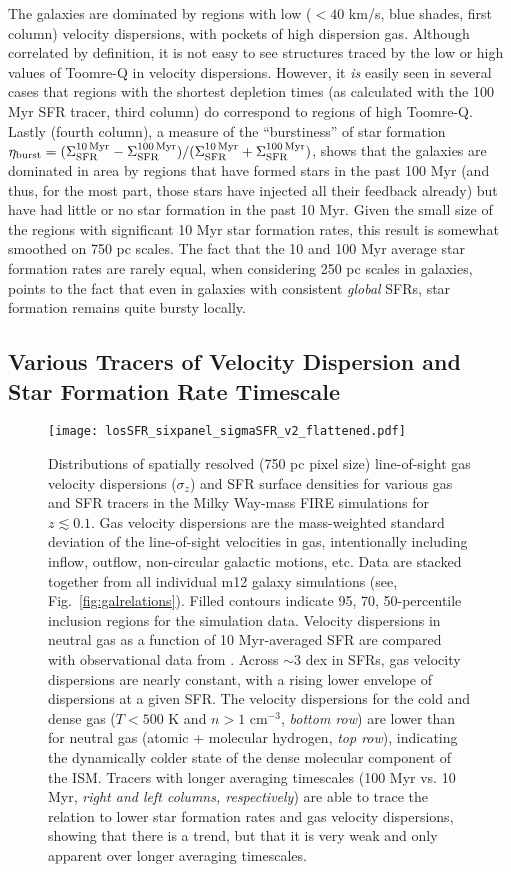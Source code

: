 \documentclass[usletter,fleqn,usenatbib]{mnras}
\begin{document}
The galaxies are dominated by regions with low ($<40$ km/s, blue shades, first column) velocity dispersions, with pockets of high dispersion gas.  Although correlated by definition, it is not easy to see structures traced by the low or high values of Toomre-Q in velocity dispersions.  However, it \emph{is} easily seen in several cases that regions with the shortest depletion times (as calculated with the 100 Myr SFR tracer, third column) do correspond to regions of high Toomre-Q.  Lastly (fourth column), a measure of the ``burstiness'' of star formation $\eta_{\rm burst} = (\Sigma_{\rm SFR}^{\rm 10\,Myr}- \Sigma_{\rm SFR}^{\rm 100\, Myr})/(\Sigma_{\rm SFR}^{\rm 10 \, Myr}+ \Sigma_{\rm SFR}^{\rm 100\,Myr})$, shows that the galaxies are dominated in area by regions that have formed stars in the past 100 Myr (and thus, for the most part, those stars have injected all their feedback already) but have had little or no star formation in the past 10 Myr.  Given the small size of the regions with significant 10 Myr star formation rates, this result is somewhat smoothed on 750 pc scales. The fact that the 10 and 100 Myr average star formation rates are rarely equal, when considering 250 pc scales in galaxies, points to the fact that even in galaxies with consistent \emph{global} SFRs, star formation remains quite bursty locally.
\subsection{Various Tracers of Velocity Dispersion and Star Formation Rate Timescale}\label{sec:sfrs}

\begin{figure*}
	\centering
	\texttt{[image: losSFR\_sixpanel\_sigmaSFR\_v2\_flattened.pdf]}
	\caption{Distributions of spatially resolved (750 pc pixel size) line-of-sight gas velocity dispersions ($\sigma_z$) and SFR surface densities for various gas and SFR tracers in the Milky Way-mass FIRE simulations for $z \lesssim 0.1$.  Gas velocity dispersions are the mass-weighted standard deviation of the line-of-sight velocities in gas, intentionally including inflow, outflow, non-circular galactic motions, etc. Data are stacked together from all individual m12 galaxy simulations (see, Fig.~\ref{fig:galrelations}).  Filled contours indicate 95, 70, 50-percentile inclusion regions for the simulation data.  Velocity dispersions in neutral gas as a function of 10 Myr-averaged SFR are compared with observational data from \citet{Zhou2017}.  Across $\sim 3$ dex in SFRs, gas velocity dispersions are nearly constant, with a rising lower envelope of dispersions at a given SFR.  The velocity dispersions for the cold and dense gas ($T < 500$ K and $n > 1$ cm$^{-3}$, \emph{bottom row}) are lower than for neutral gas (atomic + molecular hydrogen, \emph{top row}), indicating the dynamically colder state of the dense molecular component of the ISM.  Tracers with longer averaging timescales (100 Myr vs. 10 Myr, \emph{right and left columns, respectively}) are able to trace the relation to lower star formation rates and gas velocity dispersions, showing that there is a trend, but that it is very weak and only apparent over longer averaging timescales.}
	\label{fig:tracers}
\end{figure*}
\end{document}
